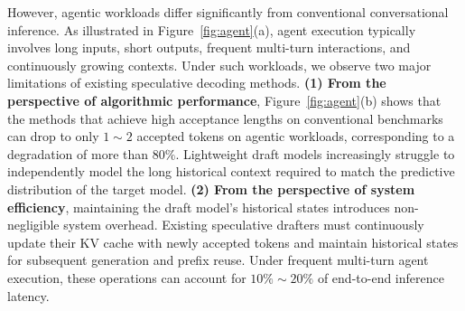 
However, agentic workloads differ significantly from conventional conversational inference. As illustrated in Figure~\ref{fig:agent}(a), agent execution typically involves long inputs, short outputs, frequent multi-turn interactions, and continuously growing contexts. Under such workloads, we observe two major limitations of existing speculative decoding methods. \textbf{(1) From the perspective of algorithmic performance},  Figure~\ref{fig:agent}(b) shows that the methods that achieve high acceptance lengths on conventional benchmarks can drop to only \(1\sim2\) accepted tokens on agentic workloads, corresponding to a degradation of more than \(80\%\). Lightweight draft models increasingly struggle to independently model the long historical context required to match the predictive distribution of the target model. \textbf{(2) From the perspective of system efficiency}, maintaining the draft model's historical states introduces non-negligible system overhead. Existing speculative drafters must continuously update their KV cache with newly accepted tokens and maintain historical states for subsequent generation and prefix reuse. Under frequent multi-turn agent execution, these operations can account for \(10\%\sim20\%\) of end-to-end inference latency.


